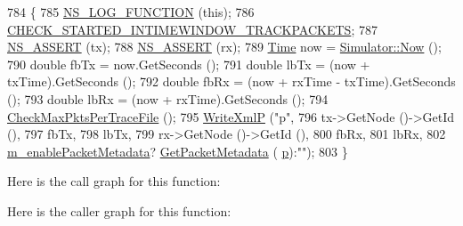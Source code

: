 \begin{DoxyCode}
784 \{
785   \hyperlink{log-macros-disabled_8h_a90b90d5bad1f39cb1b64923ea94c0761}{NS\_LOG\_FUNCTION} (\textcolor{keyword}{this});
786   \hyperlink{animation-interface_8h_acdf351a3155a6ccf1813189e10dba8f5}{CHECK\_STARTED\_INTIMEWINDOW\_TRACKPACKETS};
787   \hyperlink{assert_8h_a6dccdb0de9b252f60088ce281c49d052}{NS\_ASSERT} (tx);
788   \hyperlink{assert_8h_a6dccdb0de9b252f60088ce281c49d052}{NS\_ASSERT} (rx);
789   \hyperlink{namespacens3_1_1TracedValueCallback_a7ffd3e7c142ffe7c8a1d2db9b8de38ec}{Time} now = \hyperlink{classns3_1_1Simulator_ac3178fa975b419f7875e7105be122800}{Simulator::Now} ();
790   \textcolor{keywordtype}{double} fbTx = now.GetSeconds ();
791   \textcolor{keywordtype}{double} lbTx = (now + txTime).GetSeconds ();
792   \textcolor{keywordtype}{double} fbRx = (now + rxTime - txTime).GetSeconds ();
793   \textcolor{keywordtype}{double} lbRx = (now + rxTime).GetSeconds ();
794   \hyperlink{classns3_1_1AnimationInterface_a99838e0ce8e0f7d8c81b44e6e4efdab0}{CheckMaxPktsPerTraceFile} ();
795   \hyperlink{classns3_1_1AnimationInterface_aa44bd8e76ff1ff7b0d3ac9e5add0a61d}{WriteXmlP} (\textcolor{stringliteral}{"p"}, 
796              tx->GetNode ()->GetId (), 
797              fbTx, 
798              lbTx, 
799              rx->GetNode ()->GetId (), 
800              fbRx, 
801              lbRx, 
802              \hyperlink{classns3_1_1AnimationInterface_a5dce9d3fd3d987ef97f68528c0bbf1d0}{m\_enablePacketMetadata}? \hyperlink{classns3_1_1AnimationInterface_ae117b346d05f0f13728f68ecb1050b0b}{GetPacketMetadata} (
      \hyperlink{lte__link__budget_8m_ac9de518908a968428863f829398a4e62}{p}):\textcolor{stringliteral}{""});
803 \}
\end{DoxyCode}


Here is the call graph for this function\+:




Here is the caller graph for this function\+:


